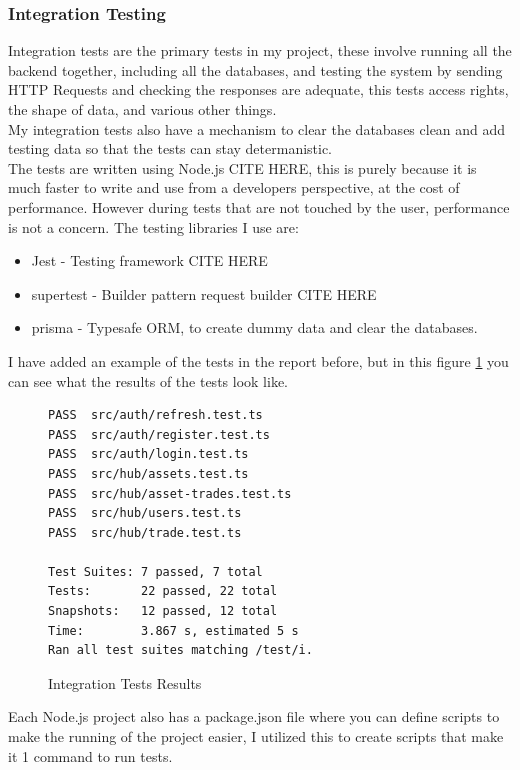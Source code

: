\documentclass[titlepage]{article}
\begin{document}
\subsubsection{Integration Testing}
Integration tests are the primary tests in my project, these involve running all the backend together, including all the databases, and testing the system by sending HTTP Requests and checking the responses are adequate, this tests access rights, the shape of data, and various other things. \\ 
My integration tests also have a mechanism to clear the databases clean and add testing data so that the tests can stay determanistic. \\

The tests are written using Node.js CITE HERE, this is purely because it is much faster to write and use from a developers perspective, at the cost of performance. However during tests that are not touched by the user, performance is not a concern. The testing libraries I use are:

\begin{itemize}
  \item Jest - Testing framework CITE HERE
  \item supertest - Builder pattern request builder CITE HERE
  \item prisma - Typesafe ORM, to create dummy data and clear the databases.
\end{itemize}

I have added an example of the tests in the report before, but in this figure \ref{integration} you can see what the results of the tests look like.

\begin{figure}[h]
  \caption{Integration Tests Results}
  \label{integration}
  \begin{verbatim}
PASS  src/auth/refresh.test.ts
PASS  src/auth/register.test.ts
PASS  src/auth/login.test.ts
PASS  src/hub/assets.test.ts
PASS  src/hub/asset-trades.test.ts
PASS  src/hub/users.test.ts
PASS  src/hub/trade.test.ts

Test Suites: 7 passed, 7 total
Tests:       22 passed, 22 total
Snapshots:   12 passed, 12 total
Time:        3.867 s, estimated 5 s
Ran all test suites matching /test/i.
  \end{verbatim}
\end{figure}

Each Node.js project also has a package.json file where you can define scripts to make the running of the project easier, I utilized this to create scripts that make it 1 command to run tests.
\end{document}
